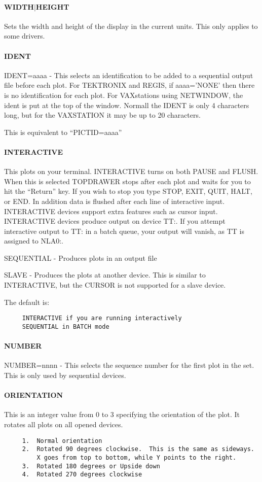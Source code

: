 \paragraph{WIDTH$|$HEIGHT}
Sets  the width and height of the display in the current units.  This
only applies to some drivers.  
\paragraph{IDENT}
IDENT=aaaa  -  This  selects  an  identification  to  be  added  to a
sequential output file before each plot.  For TEKTRONIX and REGIS, if
aaaa='NONE'  then  there  is  no  identification  for each plot.  For
VAXstations using NETWINDOW, the ident is  put  at  the  top  of  the
window.   Normall  the  IDENT  is only 4 characters long, but for the
VAXSTATION it may be up to 20 characters.  

This is equivalent to ``PICTID=aaaa'' 
\paragraph{INTERACTIVE}
This  plots  on  your  terminal.  INTERACTIVE turns on both PAUSE and
FLUSH.  When this is selected TOPDRAWER stops  after  each  plot  and
waits  for you to hit the ``Return'' key.  If you wish to stop you type
STOP, EXIT, QUIT, HALT, or END.  In addition data  is  flushed  after
each  line  of  interactive input.  INTERACTIVE devices support extra
features such as cursor input.  INTERACTIVE devices produce output on
device  TT:.   If  you  attempt interactive output to TT:  in a batch
queue, your output will vanish, as TT is assigned to NLA0:.  

SEQUENTIAL - Produces plots in an output file 

SLAVE  -  Produces  the  plots at another device.  This is similar to
INTERACTIVE, but the CURSOR is not supported for a slave device.  

The default is:  
\begin{verbatim}
     INTERACTIVE if you are running interactively 
     SEQUENTIAL in BATCH mode 
\end{verbatim}
\paragraph{NUMBER}
NUMBER=nnnn  - This selects the sequence number for the first plot in
the set.  This is only used by sequential devices.  
\paragraph{ORIENTATION}
This  is  an  integer value from 0 to 3 specifying the orientation of
the plot.  It rotates all plots on all opened devices.  
\begin{verbatim}
     1.  Normal orientation 
     2.  Rotated 90 degrees clockwise.  This is the same as sideways.
         X goes from top to bottom, while Y points to the right.  
     3.  Rotated 180 degrees or Upside down 
     4.  Rotated 270 degrees clockwise 
\end{verbatim}
